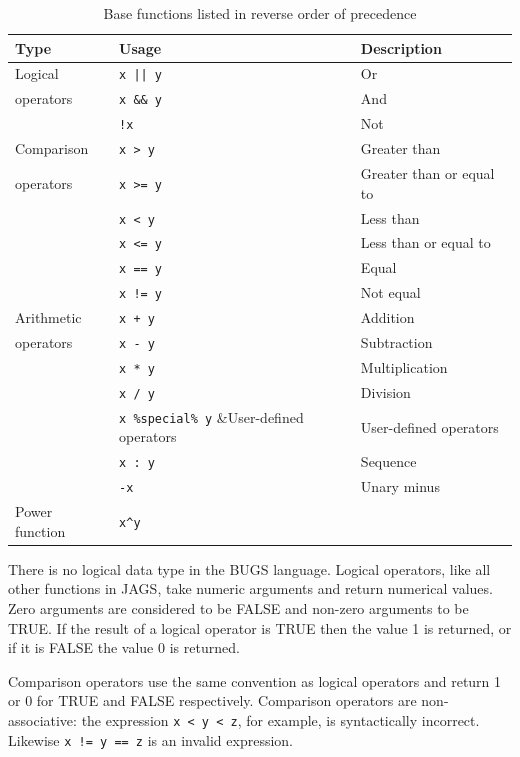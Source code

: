 \documentclass[11pt, a4paper, titlepage]{report}
\begin{document}
\begin{table}[h]
\begin{center}
\begin{tabular}{lll}
\hline
Type & Usage & Description\\ 
\hline
Logical           & \verb+x || y+ & Or \\
operators         & \verb+x && y+ & And \\
                  & \verb+!x+     & Not \\
\hline
Comparison  & \verb+x > y+ & Greater than\\
operators   & \verb+x >= y+ & Greater than or equal to  \\
            & \verb+x < y+ & Less than \\
            & \verb+x <= y+ & Less than or equal to \\
            & \verb+x == y+ & Equal \\
            & \verb+x != y+ & Not equal \\
\hline
Arithmetic  & \verb-x + y- & Addition \\
operators   & \verb+x - y+ & Subtraction\\
            & \verb+x * y+ & Multiplication \\
            & \verb+x / y+ & Division \\
            & \verb+x %special% y+ &User-defined operators\\
            & \verb+x : y+ & Sequence \\
            & \verb+-x+ & Unary minus\\
\hline
Power function & \verb+x^y+ & \\
\hline
\end{tabular}
\caption{Base functions listed in reverse order of precedence 
  \label{table:base:functions}}
\end{center}
\end{table}

There is no logical data type in the BUGS language.  Logical
operators, like all other functions in JAGS, take numeric arguments
and return numerical values. Zero arguments are considered to be FALSE and
non-zero arguments to be TRUE. If the result of a logical operator is
TRUE then the value 1 is returned, or if it is FALSE the value 0 is
returned.

Comparison operators use the same convention as logical operators and
return 1 or 0 for TRUE and FALSE respectively.  Comparison operators
are non-associative: the expression \verb+x < y < z+, for example, is
syntactically incorrect. Likewise \verb+x != y == z+ is an invalid
expression.
\end{document}
